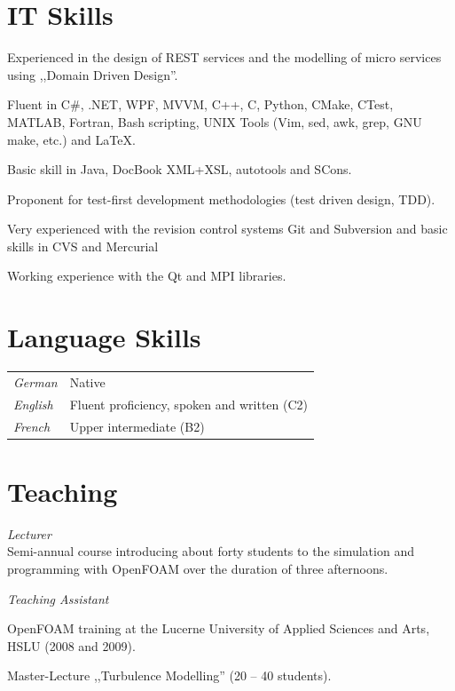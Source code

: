 \documentclass[line,11pt,a4paper]{../resume}
\begin{document}
\begin{resume}
\section{\mysidestyle IT Skills}\vspace{6mm}
\begin{list2}
  \item Experienced in the design of REST services and the modelling of micro
    services using ,,Domain Driven Design''.
  \item Fluent in C\#, .NET, WPF, MVVM, C++, C, Python, CMake, CTest, MATLAB,
    Fortran, Bash scripting, UNIX Tools (Vim, sed, awk, grep, GNU make, etc.)
    and {\selectfont\LaTeX}.
  \item Basic skill in Java, DocBook XML+XSL, autotools and SCons.
  \item Proponent for test-first development methodologies (test driven design,
    TDD).
  \item Very experienced with the revision control systems Git and Subversion
    and basic skills in CVS and Mercurial
  \item Working experience with the Qt and MPI libraries.
\end{list2}

\section{\mysidestyle Language Skills}\vspace{2mm}
\begin{tabular}{@{}ll}
  \textsl{German}   & Native \\
  \textsl{English}  & Fluent proficiency, spoken and written (C2) \\
  \textsl{French}  & Upper intermediate (B2) \\
\end{tabular}

\section{\mysidestyle Teaching}\vspace{2mm}

\textsl{Lecturer}\\
Semi-annual course introducing about forty students to the simulation and
programming with OpenFOAM over the duration of three afternoons.

\textsl{Teaching Assistant}
\begin{list2}
\item OpenFOAM training at the Lucerne University of Applied Sciences and Arts, HSLU
(2008 and 2009).
\item Master-Lecture ,,Turbulence Modelling'' (20 -- 40 students).
\end{list2}


\end{resume}
\end{document}
